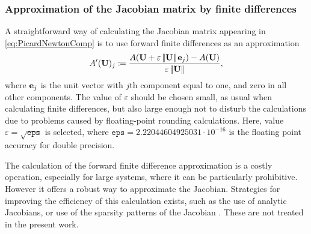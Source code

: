 \subsubsection{Approximation of the Jacobian matrix by finite differences}

A straightforward way of calculating the Jacobian matrix appearing in \cref{eq:PicardNewtonComp} is to use forward finite differences as an approximation
\begin{equation}
	A'(\textbf{U})_j \coloneqq \frac{A(\textbf{U}+\varepsilon\left|\!\left| {\textbf{U}} \right|\!\right|\textbf{e}_j )-A(\textbf{U})  }{\varepsilon\left|\!\left| {\textbf{U}} \right|\!\right|},
\end{equation}
where $\textbf{e}_j$ is the unit vector with $j$th component equal to one, and zero in all other components. The value of $\varepsilon$ should be chosen small, as usual when calculating finite differences, but also large enough not to disturb the calculations due to problems caused by floating-point rounding calculations.  Here, value $\varepsilon = \sqrt{\mathtt{eps}}$ is selected, where $\mathtt{eps} = 2.22044604925031 \cdot 10^{-16}$ is the floating point accuracy for double precision.

The calculation of the forward finite difference approximation is a costly operation, especially for large systems, where it can be particularly prohibitive. However it offers a robust way to approximate the Jacobian. Strategies for improving the efficiency of this calculation exists, such as the use of analytic Jacobians, or use of the sparsity patterns of the Jacobian \parencite{kelleyIterativeMethodsLinear1995}. These are not treated in the present work. 
